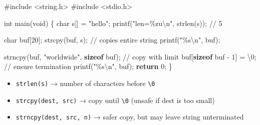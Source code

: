 \documentclass[
  letterpaper,
  DIV=11,
  numbers=noendperiod]{scrreprt}
\newenvironment{Shaded}{\begin{snugshade}}{\end{snugshade}}
\newcommand{\CharTok}[1]{\textcolor[rgb]{0.13,0.47,0.30}{#1}}
\newcommand{\CommentTok}[1]{\textcolor[rgb]{0.37,0.37,0.37}{#1}}
\newcommand{\ControlFlowTok}[1]{\textcolor[rgb]{0.00,0.23,0.31}{\textbf{#1}}}
\newcommand{\DataTypeTok}[1]{\textcolor[rgb]{0.68,0.00,0.00}{#1}}
\newcommand{\DecValTok}[1]{\textcolor[rgb]{0.68,0.00,0.00}{#1}}
\newcommand{\ImportTok}[1]{\textcolor[rgb]{0.00,0.46,0.62}{#1}}
\newcommand{\KeywordTok}[1]{\textcolor[rgb]{0.00,0.23,0.31}{\textbf{#1}}}
\newcommand{\NormalTok}[1]{\textcolor[rgb]{0.00,0.23,0.31}{#1}}
\newcommand{\OperatorTok}[1]{\textcolor[rgb]{0.37,0.37,0.37}{#1}}
\newcommand{\PreprocessorTok}[1]{\textcolor[rgb]{0.68,0.00,0.00}{#1}}
\newcommand{\SpecialCharTok}[1]{\textcolor[rgb]{0.37,0.37,0.37}{#1}}
\newcommand{\StringTok}[1]{\textcolor[rgb]{0.13,0.47,0.30}{#1}}
\providecommand{\tightlist}{%
  \setlength{\itemsep}{0pt}\setlength{\parskip}{0pt}}
\begin{document}
\begin{Shaded}
\begin{Highlighting}[]
\PreprocessorTok{\#include }\ImportTok{\textless{}string.h\textgreater{}}
\PreprocessorTok{\#include }\ImportTok{\textless{}stdio.h\textgreater{}}

\DataTypeTok{int}\NormalTok{ main}\OperatorTok{(}\DataTypeTok{void}\OperatorTok{)} \OperatorTok{\{}
    \DataTypeTok{char}\NormalTok{ s}\OperatorTok{[]} \OperatorTok{=} \StringTok{"hello"}\OperatorTok{;}
\NormalTok{    printf}\OperatorTok{(}\StringTok{"len=}\SpecialCharTok{\%zu\textbackslash{}n}\StringTok{"}\OperatorTok{,}\NormalTok{ strlen}\OperatorTok{(}\NormalTok{s}\OperatorTok{));}   \CommentTok{// 5}

    \DataTypeTok{char}\NormalTok{ buf}\OperatorTok{[}\DecValTok{20}\OperatorTok{];}
\NormalTok{    strcpy}\OperatorTok{(}\NormalTok{buf}\OperatorTok{,}\NormalTok{ s}\OperatorTok{);}                   \CommentTok{// copies entire string}
\NormalTok{    printf}\OperatorTok{(}\StringTok{"}\SpecialCharTok{\%s\textbackslash{}n}\StringTok{"}\OperatorTok{,}\NormalTok{ buf}\OperatorTok{);}

\NormalTok{    strncpy}\OperatorTok{(}\NormalTok{buf}\OperatorTok{,} \StringTok{"worldwide"}\OperatorTok{,} \KeywordTok{sizeof}\NormalTok{ buf}\OperatorTok{);} \CommentTok{// copy with limit}
\NormalTok{    buf}\OperatorTok{[}\KeywordTok{sizeof}\NormalTok{ buf }\OperatorTok{{-}} \DecValTok{1}\OperatorTok{]} \OperatorTok{=} \CharTok{\textquotesingle{}}\SpecialCharTok{\textbackslash{}0}\CharTok{\textquotesingle{}}\OperatorTok{;}            \CommentTok{// ensure termination}
\NormalTok{    printf}\OperatorTok{(}\StringTok{"}\SpecialCharTok{\%s\textbackslash{}n}\StringTok{"}\OperatorTok{,}\NormalTok{ buf}\OperatorTok{);}
    \ControlFlowTok{return} \DecValTok{0}\OperatorTok{;}
\OperatorTok{\}}
\end{Highlighting}
\end{Shaded}

\begin{itemize}
\tightlist
\item
  \texttt{strlen(s)} → number of characters before
  \texttt{\textquotesingle{}\textbackslash{}0\textquotesingle{}}
\item
  \texttt{strcpy(dest,\ src)} → copy until
  \texttt{\textquotesingle{}\textbackslash{}0\textquotesingle{}} (unsafe
  if dest is too small)
\item
  \texttt{strncpy(dest,\ src,\ n)} → safer copy, but may leave string
  unterminated
\end{itemize}
\end{document}
